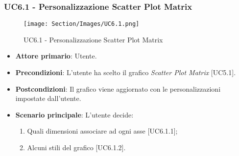 \subsubsection{UC6.1 - Personalizzazione Scatter Plot Matrix}
\begin{figure}[h]
\texttt{[image: Section/Images/UC6.1.png]}
\centering
\caption{UC6.1 - Personalizzazione Scatter Plot Matrix}
\end{figure}
\begin{itemize}
	\item \textbf{Attore primario}: Utente.
	
	\item \textbf{Precondizioni}: L'utente ha scelto il grafico \textit{Scatter Plot Matrix} [UC5.1].
	
	\item \textbf{Postcondizioni}: Il grafico viene aggiornato con le personalizzazioni impostate dall'utente.
	
	\item \textbf{Scenario principale}: L'utente decide:

\begin{enumerate}
\item Quali dimensioni associare ad ogni asse [UC6.1.1];
\item Alcuni stili del grafico [UC6.1.2].
\end{enumerate}	
	
		

\end{itemize}


